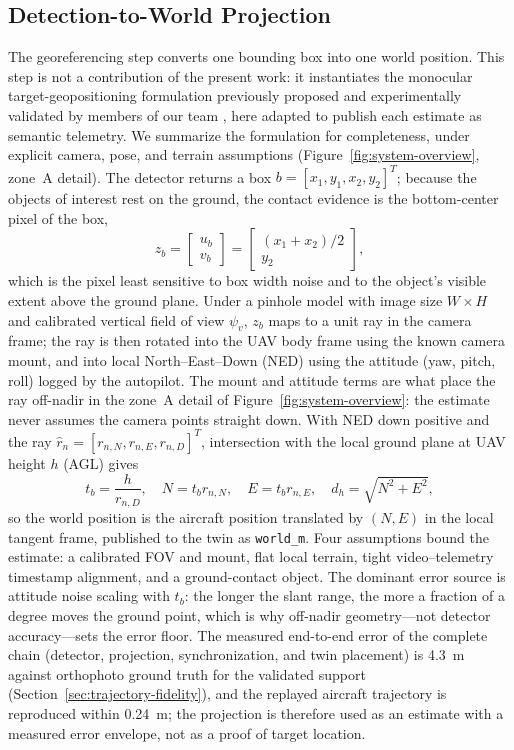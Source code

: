 \documentclass[fleqn]{VRIH2025}
\newcommand{\code}[1]{\texttt{#1}}
\begin{document}
\subsection{Detection-to-World Projection}
\label{sec:detection-to-world}
The georeferencing step converts one bounding box into one world position. This step is not a contribution of the present work: it instantiates the monocular target-geopositioning formulation previously proposed and experimentally validated by members of our team \cite{alaez2023geopositioning}, here adapted to publish each estimate as semantic telemetry. We summarize the formulation for completeness, under explicit camera, pose, and terrain assumptions (Figure~\ref{fig:system-overview}, zone~A detail). The detector returns a box \(b=[x_1,y_1,x_2,y_2]^T\); because the objects of interest rest on the ground, the contact evidence is the bottom-center pixel of the box,
\begin{equation}
z_b = \begin{bmatrix} u_b \\ v_b \end{bmatrix} = \begin{bmatrix} (x_1+x_2)/2 \\ y_2 \end{bmatrix},
\end{equation}
which is the pixel least sensitive to box width noise and to the object's visible extent above the ground plane. Under a pinhole model with image size \(W\times H\) and calibrated vertical field of view \(\psi_v\), \(z_b\) maps to a unit ray in the camera frame; the ray is then rotated into the UAV body frame using the known camera mount, and into local North--East--Down (NED) using the attitude (yaw, pitch, roll) logged by the autopilot. The mount and attitude terms are what place the ray off-nadir in the zone~A detail of Figure~\ref{fig:system-overview}: the estimate never assumes the camera points straight down. With NED down positive and the ray \(\hat r_n=[r_{n,N}, r_{n,E}, r_{n,D}]^T\), intersection with the local ground plane at UAV height \(h\) (AGL) gives
\begin{equation}
t_b = \frac{h}{r_{n,D}}, \quad N=t_b r_{n,N}, \quad E=t_b r_{n,E}, \quad d_h=\sqrt{N^2+E^2},
\end{equation}
so the world position is the aircraft position translated by \((N,E)\) in the local tangent frame, published to the twin as \code{world\_m}. Four assumptions bound the estimate: a calibrated FOV and mount, flat local terrain, tight video--telemetry timestamp alignment, and a ground-contact object. The dominant error source is attitude noise scaling with \(t_b\): the longer the slant range, the more a fraction of a degree moves the ground point, which is why off-nadir geometry---not detector accuracy---sets the error floor. The measured end-to-end error of the complete chain (detector, projection, synchronization, and twin placement) is 4.3~m against orthophoto ground truth for the validated support (Section~\ref{sec:trajectory-fidelity}), and the replayed aircraft trajectory is reproduced within 0.24~m; the projection is therefore used as an estimate with a measured error envelope, not as a proof of target location.
\end{document}
